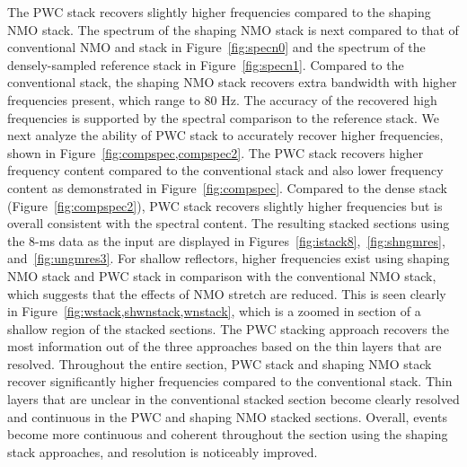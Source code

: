 


The PWC stack recovers slightly higher frequencies compared to the shaping NMO stack. 
The spectrum of the shaping NMO stack is next compared to that of conventional NMO and stack in Figure~\ref{fig:specn0} 
and the spectrum of the densely-sampled reference stack in Figure~\ref{fig:specn1}. Compared to the conventional stack, the 
shaping NMO stack recovers extra bandwidth with higher frequencies present, which range to 80 Hz. 
The accuracy of the recovered high frequencies is supported by the spectral comparison to the reference stack.
We next analyze the ability of PWC stack to accurately recover higher frequencies, shown in Figure~\ref{fig:compspec,compspec2}.
The PWC stack recovers higher frequency content compared to the conventional stack and also lower frequency content as 
demonstrated in Figure~\ref{fig:compspec}. Compared to the dense stack (Figure~\ref{fig:compspec2}), PWC stack
recovers slightly higher frequencies but is overall consistent with the spectral content.
The resulting stacked sections using the 8-ms data as the input are displayed in Figures~\ref{fig:istack8},~\ref{fig:shngmres}, and~\ref{fig:ungmres3}. 
For shallow reflectors, higher frequencies exist using shaping NMO stack and PWC stack in comparison with 
the conventional NMO stack, which suggests that the effects of NMO stretch are reduced. This is seen clearly 
in Figure~\ref{fig:wstack,shwnstack,wnstack}, which is a zoomed in section of a shallow region of the stacked sections.
The PWC stacking approach recovers the most information out of the three approaches based on the thin layers that
are resolved. Throughout the entire section, PWC stack and shaping NMO stack recover significantly higher frequencies compared to 
the conventional stack. Thin layers that are unclear in the conventional stacked section become clearly resolved 
and continuous in the PWC and shaping NMO stacked sections. Overall, events become more continuous and coherent throughout 
the section using the shaping stack approaches, and resolution is noticeably improved. 

